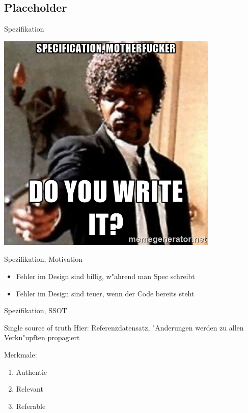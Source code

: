 \documentclass{beamer}
\begin{document}
\subsection{Placeholder}

\begin{frame}{Spezifikation}
	\begin{center}
		\includegraphics[scale=.5]{spec-do-you-write-it.jpg}
	\end{center}
\end{frame}

\begin{frame}{Spezifikation, Motivation}
	\begin{itemize}
		\item Fehler im Design sind billig, w"ahrend man Spec schreibt
		\item Fehler im Design sind teuer, wenn der Code bereits steht
	\end{itemize}
\end{frame}

\begin{frame}{Spezifikation, SSOT}
	\begin{block}{Single source of truth}
		Hier: Referenzdatensatz, "Anderungen werden zu allen Verkn"upften propagiert
	\end{block}
	
	Merkmale:
	\begin{enumerate}
		\item Authentic
		\item Relevant
		\item Referable
	\end{enumerate}
\end{frame}
\end{document}

